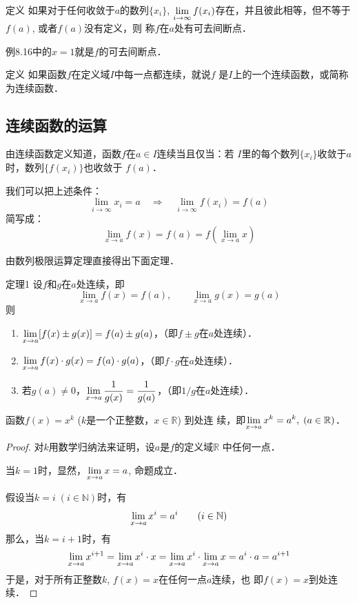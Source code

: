 \begin{blk}{定义}
     如果对于任何收敛于$a$的数列$\{x_i\}$, $\displaystyle\lim_{i\to\infty}f(x_i)$存在，并且彼此相等，但不等于$f(a)$, 或者$f(a)$没有定义，则
称$f$在$a$处有可去间断点．
\end{blk}

例8.16中的$x=1$就是$f$的可去间断点．

\begin{blk}{定义}
    如果函数$f$在定义域$I$中每一点都连续，就说$f$
是$I$上的一个连续函数，或简称为连续函数．
\end{blk}

\subsection{连续函数的运算}
由连续函数定义知道，函数$f$在$a\in I$连续当且仅当：若
$I$里的每个数列$\{x_i\}$收敛于$a$时，数列$\{f(x_i)\}$也收敛于
$f(a)$．

我们可以把上述条件：
\[\lim_{i\to \infty}x_i=a \quad \Longrightarrow\quad \lim_{i\to \infty}f(x_i)=f(a)\]
简写成：
\[\lim_{x\to a}f(x)=f(a)=f\left(\lim_{x\to a}x\right)\]

由数列极限运算定理直接得出下面定理．

\begin{blk}{定理1}
    设$f$和$g$在$a$处连续，即
    \[\lim_{x\to a}f(x)=f(a),\qquad \lim_{x\to a}g(x)=g(a)\]
    则
\begin{enumerate}
    \item $\displaystyle\lim_{x\to a}[f(x)\pm g(x)]=f(a)\pm g(a)$，（即$f\pm g$在$a$处连续）．
    \item $\displaystyle\lim_{x\to a}f(x)\cdot g(x)=f(a)\cdot g(a)$，（即$f\cdot g$在$a$处连续）．
    \item 若$g(a)\ne 0$，$\displaystyle\lim_{x\to a}\dfrac{1}{g(x)}=\dfrac{1}{g(a)}$，（即$1/g$在$a$处连续）．
\end{enumerate}
\end{blk}

\begin{example}
    函数$f(x)=x^k$ ($k$是一个正整数，$x\in\mathbb{R}$) 到处连
续，即$\displaystyle\lim_{x\to a}x^k=a^k,\; (a\in\mathbb{R})$．
\end{example}

\begin{proof}
对$k$用数学归纳法来证明，设$a$是$f$的定义域$\mathbb{R}$
中任何一点．

当$k=1$时，显然，$\displaystyle\lim_{x\to a}x=a$, 命题成立．

假设当$k=i\; (i\in\mathbb{N})$时，有
\[\displaystyle\lim_{x\to a} x^i=a^i\qquad (i\in\mathbb{N})\]
那么，当$k=i+1$时，有
\[\displaystyle\lim_{x\to a}x^{i+1}=\displaystyle\lim_{x\to a} x^i\cdot x=\displaystyle\lim_{x\to a} x^i\cdot \displaystyle\lim_{x\to a} x=a^i\cdot a=a^{i+1}\]    
于是，对于所有正整数$k$, $f(x)=x$在任何一点$a$连续，也
即$f(x)=x$到处连续．
\end{proof}


